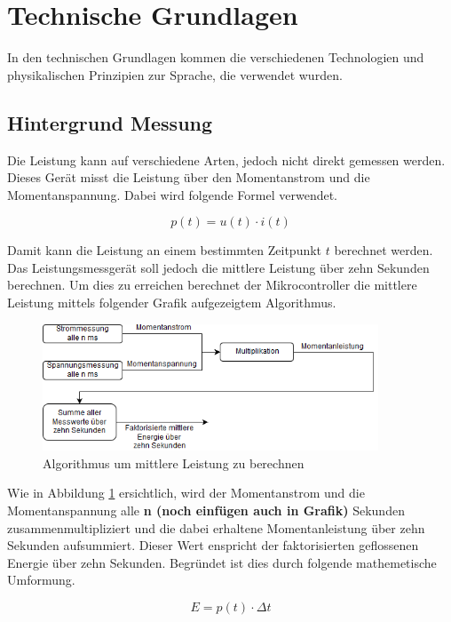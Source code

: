 \section{Technische Grundlagen}
In den technischen Grundlagen kommen die verschiedenen Technologien und physikalischen Prinzipien zur Sprache, die verwendet wurden. 
\subsection{Hintergrund Messung}%
Die Leistung kann auf verschiedene Arten, jedoch nicht direkt gemessen werden. Dieses Gerät misst die Leistung über den Momentanstrom und die Momentanspannung. Dabei wird folgende Formel verwendet.

\begin{equation}
	p(t) = u(t) \cdot i(t)
\end{equation}
\label{eq:Momentanleistung}

Damit kann die Leistung an einem bestimmten Zeitpunkt $t$ berechnet werden. Das Leistungsmessgerät soll jedoch die mittlere Leistung über zehn Sekunden berechnen. Um dies zu erreichen berechnet der Mikrocontroller die mittlere Leistung mittels folgender Grafik aufgezeigtem Algorithmus.
\begin{figure}[H]
\begin{center}
	\includegraphics[width=100mm]{images/messung_schematisch.png}
	\caption{Algorithmus um mittlere Leistung zu berechnen} %
	\label{fig:berechnung_P}
\end{center}
\end{figure}

Wie in Abbildung \ref{fig:berechnung_P} ersichtlich, wird der Momentanstrom und die Momentanspannung alle \textbf{n (noch einfügen auch in Grafik)} Sekunden zusammenmultipliziert und die dabei erhaltene Momentanleistung über zehn Sekunden aufsummiert. Dieser Wert enspricht der faktorisierten geflossenen Energie über zehn Sekunden. Begründet ist dies durch folgende mathemetische Umformung.

\begin{equation}
	E = p(t) \cdot \Delta t
\end{equation}
\label{eq:energie1}

